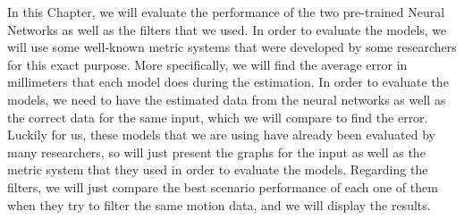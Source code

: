 In this Chapter, we will evaluate the performance of the two pre-trained Neural Networks as well as the filters that we used. In order to evaluate the models, we will use some well-known metric systems that were developed by some researchers for this exact purpose. More specifically, we will find the average error in millimeters that each model does during the estimation. In order to evaluate the models, we need to have the estimated data from the neural networks as well as the correct data for the same input, which we will compare to find the error. Luckily for us, these models that we are using have already been evaluated by many researchers, so will just present the graphs for the input as well as the metric system that they used in order to evaluate the models. Regarding the filters, we will just compare the best scenario performance of each one of them when they try to filter the same motion data, and we will display the results.